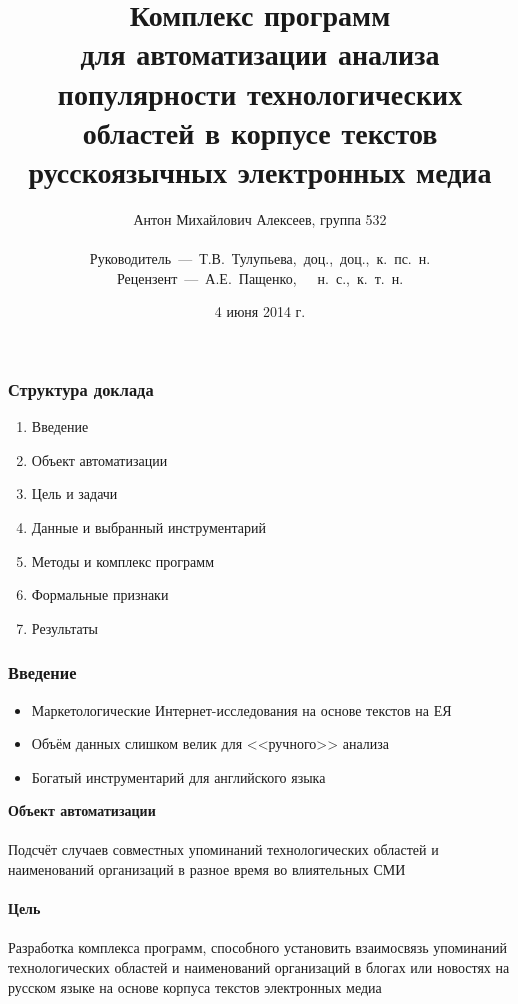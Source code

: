 \documentclass{beamer}
\title{Комплекс программ \\для автоматизации анализа популярности технологических 
областей в корпусе текстов русскоязычных электронных медиа}
\author{{\small Антон Михайлович Алексеев, группа 532\\~\\ Руководитель~---~Т.В.~Тулупьева,~доц.,~доц.,~к.~пс.~н. \\ Рецензент~---~А.Е.~Пащенко,~~~н.~с.,~к.~т.~н.}}
\institute{Санкт-Петербургский государственный университет\\Математико-механический факультет\\ Кафедра информатики}
\date{4 июня 2014 г.}
\begin{document}


{
\frame{\titlepage}
}

\begin{frame}\frametitle{Структура доклада}
    \begin{enumerate}
        \item Введение
        \item Объект автоматизации
        \item Цель и задачи
        \item Данные и выбранный инструментарий
        \item Методы и комплекс программ
        \item Формальные признаки
        \item Результаты
    \end{enumerate}
\end{frame}

\begin{frame}\frametitle{Введение}

\begin{itemize}
\item Маркетологические Интернет-исследования на основе текстов на ЕЯ
\item Объём данных слишком велик для <<ручного>> анализа
\item Богатый инструментарий для английского языка
\end{itemize}

\end{frame}

\begin{frame}
\textbf{Объект автоматизации}\\~\\
Подсчёт случаев совместных упоминаний технологических областей и наименований организаций в разное время во влиятельных СМИ\\~\\
\textbf{Цель}\\~\\
Разработка комплекса программ, способного установить взаимосвязь упоминаний технологических областей и наименований
организаций в блогах или новостях на русском языке на основе корпуса текстов электронных медиа 
\end{frame}
\end{document}
